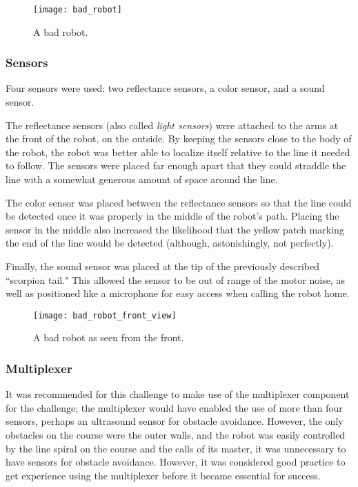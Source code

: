 \documentclass{article}
\begin{document}
	\begin{figure}[h]
	\centering
	\texttt{[image: bad\_robot]}
	\caption{A bad robot.}
	\label{fig:bad_robot}
	\end{figure}

\subsubsection{Sensors}
Four sensors were used: two reflectance sensors, a color sensor, and a sound sensor.

The reflectance sensors (also called \textit{light sensors}) were attached to the arms at the front of the robot, on the outside. By keeping the sensors close to the body of the robot, the robot was better able to localize itself relative to the line it needed to follow. The sensors were placed far enough apart that they could straddle the line with a somewhat generous amount of space around the line.

The color sensor was placed between the reflectance sensors so that the line could be detected once it was properly in the middle of the robot's path. Placing the sensor in the middle also increased the likelihood that the yellow patch marking the end of the line would be detected (although, astonishingly, not perfectly).

Finally, the sound sensor was placed at the tip of the previously described ``scorpion tail." This allowed the sensor to be out of range of the motor noise, as well as positioned like a microphone for easy access when calling the robot home.


    \begin{figure}[h]
    \centering
    \texttt{[image: bad\_robot\_front\_view]}
    \caption{A bad robot as seen from the front.}
    \label{fig:bad_robot_front_view}
    \end{figure}

\subsubsection{Multiplexer}
It was recommended for this challenge to make use of the multiplexer component for the challenge; the multiplexer would have enabled the use of more than four sensors, perhaps an ultrasound sensor for obstacle avoidance. However, the only obstacles on the course were the outer walls, and the robot was easily controlled by the line spiral on the course and the calls of its master, it was unnecessary to have sensors for obstacle avoidance. However, it was considered good practice to get experience using the multiplexer before it became essential for success.
\end{document}
